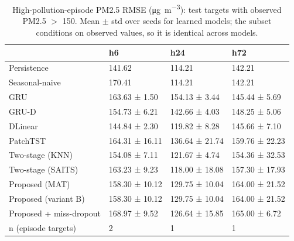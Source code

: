 \begin{table}
\caption{High-pollution-episode PM2.5 RMSE (\si{\micro\gram\per\cubic\metre}): test targets with observed PM2.5 $>$ 150. Mean $\pm$ std over seeds for learned models; the subset conditions on observed values, so it is identical across models.}
\label{tab:episode}
\begin{tabular}{llll}
\toprule
 & h6 & h24 & h72 \\
\midrule
Persistence & 141.62 & 114.21 & 142.21 \\
Seasonal-naive & 170.41 & 114.21 & 142.21 \\
GRU & 163.63 ± 1.50 & 154.13 ± 3.44 & 145.44 ± 5.69 \\
GRU-D & 154.73 ± 6.21 & 142.66 ± 4.03 & 148.25 ± 5.06 \\
DLinear & 144.84 ± 2.30 & 119.82 ± 8.28 & 145.66 ± 7.10 \\
PatchTST & 164.31 ± 16.11 & 136.64 ± 21.74 & 159.76 ± 22.23 \\
Two-stage (KNN) & 154.08 ± 7.11 & 121.67 ± 4.74 & 154.36 ± 32.53 \\
Two-stage (SAITS) & 163.23 ± 9.23 & 118.00 ± 18.08 & 157.30 ± 17.93 \\
Proposed (MAT) & 158.30 ± 10.12 & 129.75 ± 10.04 & 164.00 ± 21.52 \\
Proposed (variant B) & 158.30 ± 10.12 & 129.75 ± 10.04 & 164.00 ± 21.52 \\
Proposed + miss-dropout & 168.97 ± 9.52 & 126.64 ± 15.85 & 165.00 ± 6.72 \\
n (episode targets) & 2 & 1 & 1 \\
\bottomrule
\end{tabular}
\end{table}
